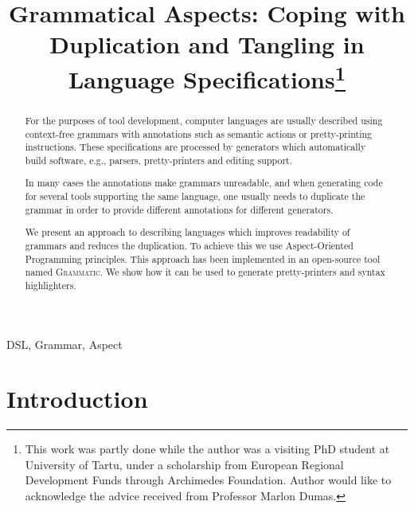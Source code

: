 \documentclass{IOS-Book-Article}     %
\newcommand{\tool}[1]{\textsc{#1}}
\newcommand{\Grammatic}[0]{\tool{Grammatic}}
\begin{document}
\begin{frontmatter}          %
%
\title{Grammatical Aspects: Coping with Duplication and Tangling in Language Specifications\thanks{This work was partly done while the author was a visiting PhD student at University of Tartu, under a scholarship from European Regional Development Funds through Archimedes Foundation. Author would like to acknowledge the advice received from Professor Marlon Dumas.}}

\author{ }
\address{ITMO University, Saint-Petersburg, Russia}
%
\begin{abstract}
	For the purposes of tool development, computer languages are usually described using context-free grammars with annotations such as semantic actions or pretty-printing instructions. 
	These specifications are processed by generators which automatically build software, e.g., parsers, pretty-printers and editing support.

	In many cases the annotations make grammars unreadable, and when generating code for several tools supporting the same language, one usually needs to duplicate the grammar in order to provide different annotations for different generators.

	We present an approach to describing languages which improves readability of grammars and reduces the duplication. To achieve this we use Aspect-Oriented Programming principles. This approach has been implemented in an open-source tool named \Grammatic{}. We show how it can be used to generate pretty-printers and syntax highlighters.
\end{abstract}

\begin{keyword}
DSL, Grammar, Aspect
\end{keyword}

\end{frontmatter}

\section*{Introduction}
\end{document}
